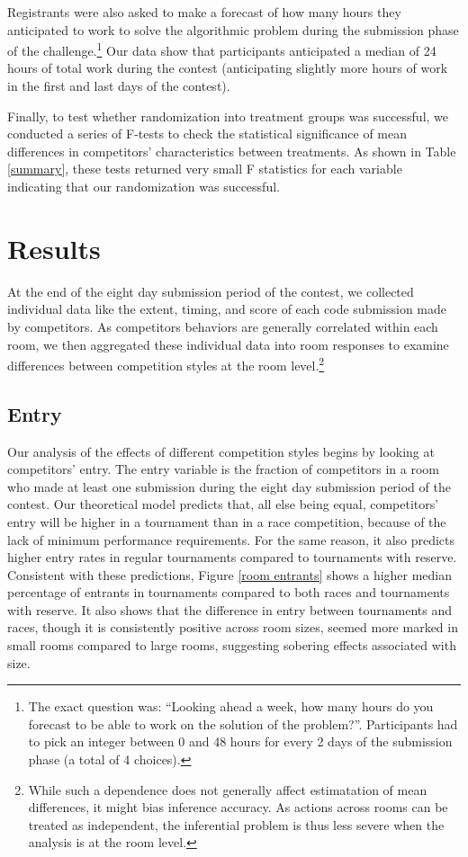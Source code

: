 \documentclass[11pt, titlepage]{article}
\begin{document}
Registrants were also asked to make a forecast of how many hours they
anticipated to work to solve the algorithmic problem during the
submission phase of the challenge.\footnote{The exact question was:
  ``Looking ahead a week, how many hours do you forecast to be able to
  work on the solution of the problem?''. Participants had to pick an
  integer between 0 and 48 hours for every 2 days of the submission
  phase (a total of 4 choices).} Our data show that participants
anticipated a median of 24 hours of total work during the contest
(anticipating slightly more hours of work in the first and last days of
the contest).

Finally, to test whether randomization into treatment groups was
successful, we conducted a series of F-tests to check the statistical
significance of mean differences in competitors' characteristics between
treatments. As shown in Table \ref{summary}, these tests returned very
small F statistics for each variable indicating that our randomization
was successful.

\section{Results}\label{results}

At the end of the eight day submission period of the contest, we
collected individual data like the extent, timing, and score of each
code submission made by competitors. As competitors behaviors are
generally correlated within each room, we then aggregated these
individual data into room responses to examine differences between
competition styles at the room level.\footnote{While such a dependence
  does not generally affect estimatation of mean differences, it might
  bias inference accuracy. As actions across rooms can be treated as
  independent, the inferential problem is thus less severe when the
  analysis is at the room level.}

\subsection{Entry}\label{entry}

Our analysis of the effects of different competition styles begins by
looking at competitors' entry. The entry variable is the fraction of
competitors in a room who made at least one submission during the eight
day submission period of the contest. Our theoretical model predicts
that, all else being equal, competitors' entry will be higher in a
tournament than in a race competition, because of the lack of minimum
performance requirements. For the same reason, it also predicts higher
entry rates in regular tournaments compared to tournaments with reserve.
Consistent with these predictions, Figure \ref{room entrants} shows a
higher median percentage of entrants in tournaments compared to both
races and tournaments with reserve. It also shows that the difference in
entry between tournaments and races, though it is consistently positive
across room sizes, seemed more marked in small rooms compared to large
rooms, suggesting sobering effects associated with size.
\end{document}
